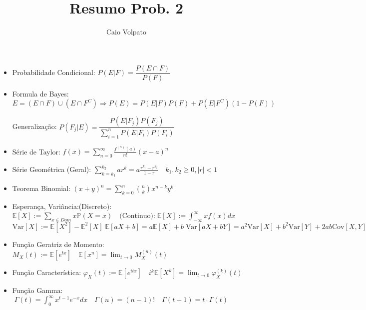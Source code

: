 \documentclass[a4paper,10pt]{article} %
\begin{document}
\title{Resumo Prob. 2}
\author{Caio Volpato }
\maketitle

\begin{itemize}

\item Probabilidade Condicional: $P(E|F)=\dfrac{P(E \cap F)}{P(F)}$

\item Formula de Bayes: $E = (E \cap F) \cup (E \cap F^C) \Rightarrow P(E) = P(E|F)P(F) + P(E|F^C)(1-P(F))$

Generalização: $P(F_j|E)=\dfrac{P(E|F_j)P(F_j)}{\sum_{i=1}^n P(E|F_i)P(F_i)}$

\item Série de Taylor: $f(x) = \displaystyle\sum_{n=0}^{\infty} \frac{f^{(n)}(a)}{n!}(x-a)^n$

\item Série Geométrica (Geral): $\displaystyle\sum_{k=k_1}^{k_2}ar^k = a  \frac{r^{k_1}-r^{k_2}}{1-r} \quad k_1,k_2 \geq 0 , |r|< 1 $

\item Teorema Binomial: $ (x+y)^n = \displaystyle\sum_{k=0}^{n} \binom{n}{k}x^{n-k}y^k$

\item Esperança, Variância:(Discreto): $\mathbb{E}[X] := \displaystyle\sum_{x \in Dom} x \mathbb{P}(X=x)\quad \mbox{(Continuo):} \; \mathbb{E}[X]:= \displaystyle\int_{-\infty}^{\infty} xf(x) dx$\\

$\mbox{Var}[X]:= \mathbb{E}[X^2] - \mathbb{E}^2[X] \; \mathbb{E}[aX+b] = a\mathbb{E}[X] + b \; \mbox{Var}[aX + bY] = a^2 \mbox{Var}[X]+b^2 \mbox{Var}[Y] + 2 a b \mbox{Cov}[X,Y]$

\item Função Geratriz de Momento: $ M_X (t) := \mathbb{E}[e^{tx}]  \quad \mathbb{E}[x^n] = \displaystyle\lim_{t \to 0} M_X^{(n)}(t)$

\item Função Característica: $ \varphi_X (t) := \mathbb{E}[e^{itx}] \quad i^k \mathbb{E}[X^k] = \displaystyle\lim_{t \to 0} \varphi_X^{(k)}(t)$

\item Função Gamma:$ \; \Gamma(t) = \displaystyle\int_0^{\infty} x^{t-1}e^{-x} dx \quad \Gamma(n) = (n-1)! \quad \Gamma(t+1)=t \cdot \Gamma(t)$



\end{itemize}
\end{document}
